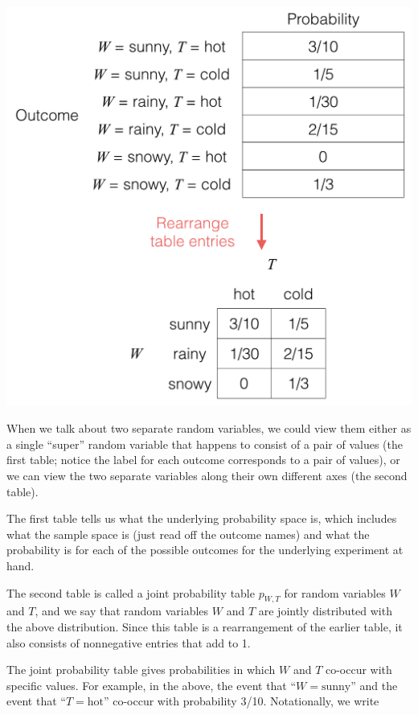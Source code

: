 \documentclass[6008notes.tex]{subfiles}
\begin{document}
{\centering\includegraphics[scale=0.4]{images_sec-joint-rv-rearrange-table} \par}

When we talk about two separate random variables, we could view them either as a single ``super'' random variable that happens to consist of a pair of values (the first table; notice the label for each outcome corresponds to a pair of values), or we can view the two separate variables along their own different axes (the second table).

The first table tells us what the underlying probability space is, which includes what the sample space is (just read off the outcome names) and what the probability is for each of the possible outcomes for the underlying experiment at hand.

The second table is called a joint probability table $p_{W,T}$ for random variables $W$ and $T$, and we say that random variables $W$ and $T$ are jointly distributed with the above distribution. Since this table is a rearrangement of the earlier table, it also consists of nonnegative entries that add to 1.

The joint probability table gives probabilities in which $W$ and $T$ co-occur with specific values. For example, in the above, the event that ``$W=\text {sunny}$'' and the event that ``$T=\text {hot}$'' co-occur with probability 3/10. Notationally, we write
\end{document}

